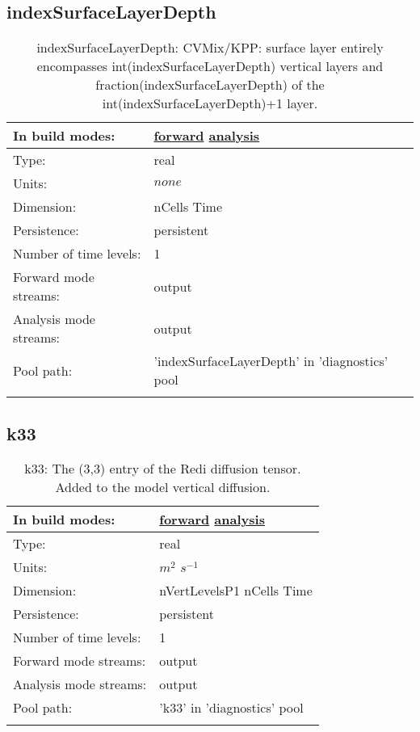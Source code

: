 \subsection[indexSurfaceLayerDepth]{indexSurfaceLayerDepth}
\label{subsec:var_sec_diagnostics_indexSurfaceLayerDepth}
\begin{center}
\begin{longtable}{| p{2.0in} | p{4.0in} |}
        \hline 
        In build modes: & \hyperref[subsec:forward_var_tab_diagnostics]{forward} \hyperref[subsec:analysis_var_tab_diagnostics]{analysis} \\
        \hline 
        Type: & real \\
        \hline 
        Units: & $none$ \\
        \hline 
        Dimension: & nCells Time \\
        \hline 
        Persistence: & persistent \\
        \hline 
        Number of time levels: & 1 \\
        \hline 
		 Forward mode streams: &  output \\
        \hline 
		 Analysis mode streams: &  output \\
        \hline 
            Pool path: & 'indexSurfaceLayerDepth' in 'diagnostics' pool
 \\
		 \hline 
    \caption{indexSurfaceLayerDepth: CVMix/KPP: surface layer entirely encompasses int(indexSurfaceLayerDepth) vertical layers and fraction(indexSurfaceLayerDepth) of the int(indexSurfaceLayerDepth)+1 layer.}
\end{longtable}
\end{center}
\subsection[k33]{k33}
\label{subsec:var_sec_diagnostics_k33}
\begin{center}
\begin{longtable}{| p{2.0in} | p{4.0in} |}
        \hline 
        In build modes: & \hyperref[subsec:forward_var_tab_diagnostics]{forward} \hyperref[subsec:analysis_var_tab_diagnostics]{analysis} \\
        \hline 
        Type: & real \\
        \hline 
        Units: & $m^2$ $s^{-1}$ \\
        \hline 
        Dimension: & nVertLevelsP1 nCells Time \\
        \hline 
        Persistence: & persistent \\
        \hline 
        Number of time levels: & 1 \\
        \hline 
		 Forward mode streams: &  output \\
        \hline 
		 Analysis mode streams: &  output \\
        \hline 
            Pool path: & 'k33' in 'diagnostics' pool
 \\
		 \hline 
    \caption{k33: The (3,3) entry of the Redi diffusion tensor. Added to the model vertical diffusion.}
\end{longtable}
\end{center}

